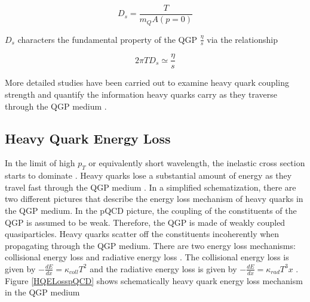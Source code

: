 \begin{equation}
D_s = \frac{T} {m_Q A(p=0)}
\end{equation}

$D_s$ characters the fundamental property of the QGP $\frac{\eta}{s}$ via the relationship 

\begin{equation}
2 \pi T D_s \simeq \frac{\eta}{s}
\end{equation}

More detailed studies have been carried out to examine heavy quark coupling strength and quantify the information heavy quarks carry as they traverse through the QGP medium \cite{HQJamie}.


\subsection{Heavy Quark Energy Loss}

In the limit of high $p_T$ or equivalently short wavelength, the inelastic cross section starts to dominate \cite{HQReview}. Heavy quarks lose a substantial amount of energy as they travel fast through the QGP medium \cite{HQELossFirst}. In a simplified schematization, there are two different pictures that describe the energy loss mechanism of heavy quarks in the QGP medium. In the pQCD picture, the coupling of the constituents of the QGP is assumed to be weak. Therefore, the QGP is made of weakly coupled quasiparticles. Heavy quarks scatter off the constituents incoherently when propagating through the QGP medium. There are two energy loss mechanisms: collisional energy loss and radiative energy loss \cite{HQRaff}. The collisional energy loss is given by $-\frac{dE}{dx} = \kappa_{coll}T^2$ and the radiative energy loss is given by  $-\frac{dE}{dx} = \kappa_{rad}T^3x$ \cite{HQCollELoss,HQRadELoss}. Figure \ref{HQELosspQCD} shows schematically heavy quark energy loss mechanism in the QGP medium



